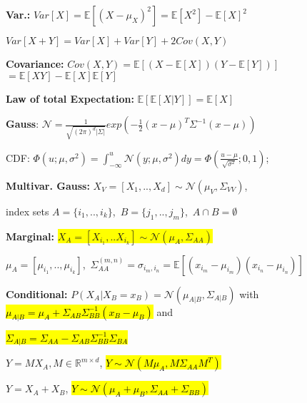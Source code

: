 \documentclass[11pt,landscape,a4paper,fleqn]{article}
\newcommand{\mhl}[1]{\setlength{\fboxsep}{0pt}\colorbox{yellow}{#1}}
\begin{document}
\begin{multicols*}{4}



		\textbf{Var.:} $Var[X] = \mathbb{E}[(X-\mu_X)^2] = \mathbb{E}[X^2] - \mathbb{E}[X]^2$

	$Var[X + Y] = Var[X] + Var[Y] + 2Cov(X,Y)$

		\textbf{Covariance:} $Cov(X, Y) = \mathbb{E}[(X - \mathbb{E}[X])(Y - \mathbb{E}[Y])]$ $=\mathbb{E}[XY] - \mathbb{E}[X]\mathbb{E}[Y]$

		\textbf{Law of total Expectation:} $\mathbb{E}[\mathbb{E}[X | Y]] = \mathbb{E}[X]$

		\textbf{Gauss}: \mbox{\fontsize{10}{6}\selectfont $\mathcal{N} = \frac{1}{\sqrt{(2\pi)^d |\Sigma|}}exp(-\frac{1}{2}(x-\mu)^T\Sigma^{-1} (x-\mu))$}

		CDF: \mbox{\fontsize{9}{6}\selectfont $\Phi(u;\mu,\sigma^2) = \int_{-\infty}^{u}\mathcal{N}(y;\mu,\sigma^2)dy=\Phi(\frac{u-\mu}{\sqrt{\sigma^2}};0,1)$;}

		\textbf{Multivar. Gauss:}
		\mbox{\fontsize{10}{6}\selectfont $X_V = [X_1, .., X_d] \sim \mathcal{N}(\mu_V, \Sigma_{VV})$},

		index sets \mbox{\fontsize{9}{6}\selectfont $A = \{i_1,..,i_k\}$, $B = \{j_1,..,j_m\}$, $A \cap B = \emptyset$}

		\textbf{Marginal:} \mhl{$X_A = [X_{i_1},..X_{i_k}] \sim \mathcal{N}(\mu_A, \Sigma_{AA})$}

		\mbox{\fontsize{8.8}{6}\selectfont $\mu_A = [\mu_{i_1},..,\mu_{i_k}]$, $\Sigma_{AA}^{(m,n)} = \sigma_{i_m,i_n} = \mathbb{E}[(x_{i_m} - \mu_{i_m}) (x_{i_n} - \mu_{i_n})]$}

		\textbf{Conditional:} $P(X_A | X_B = x_B) = \mathcal{N}(\mu_{A|B}, \Sigma_{A|B})$ with \hl{$\mu_{A|B} = \mu_A + \Sigma_{AB} \Sigma_{BB}^{-1} (x_B - \mu_B)$} and

		\hl{$\Sigma_{A|B} = \Sigma_{AA} - \Sigma_{AB} \Sigma_{BB}^{-1} \Sigma_{BA}$}

	$Y = M X_A, M \in \mathbb{R}^{m \times d}$, \hl{$Y \sim \mathcal{N}(M\mu_A, M\Sigma_{AA}M^T)$}

	$Y = X_A + X_B$, \hl{$Y \sim \mathcal{N}(\mu_A + \mu_B, \Sigma_{AA} + \Sigma_{BB})$}



\end{multicols*}
\end{document}
